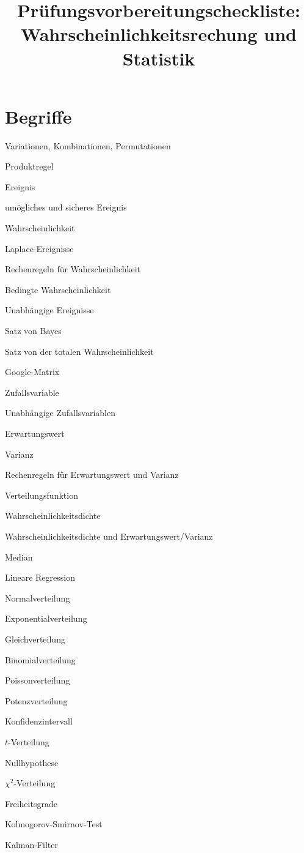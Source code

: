 \documentclass[a4paper,12pt,twocolumn]{article}
\begin{document}
\title{Prüfungsvorbereitungscheckliste:\\ Wahrscheinlichkeitsrechung und Statistik}
\date{}
\maketitle
\section{Begriffe}
\begin{compactenum}
\item Variationen, Kombinationen, Permutationen
\item Produktregel
\item Ereignis
\item umögliches und sicheres Ereignis
\item Wahrscheinlichkeit
\item Laplace-Ereignisse
\item Rechenregeln für Wahrscheinlichkeit
\item Bedingte Wahrscheinlichkeit
\item Unabhängige Ereignisse
\item Satz von Bayes
\item Satz von der totalen Wahrscheinlichkeit
\item Google-Matrix
\item Zufallsvariable
\item Unabhängige Zufallsvariablen
\item Erwartungswert
\item Varianz
\item Rechenregeln für Erwartungswert und Varianz
\item Verteilungsfunktion
\item Wahrscheinlichkeitsdichte
\item Wahrscheinlichkeitsdichte und Erwartungswert/Varianz
\item Median
\item Lineare Regression
\item Normalverteilung
\item Exponentialverteilung
\item Gleichverteilung
\item Binomialverteilung
\item Poissonverteilung
\item Potenzverteilung
\item Konfidenzintervall
\item $t$-Verteilung
\item Nullhypothese
\item $\chi^2$-Verteilung
\item Freiheitsgrade
\item Kolmogorov-Smirnov-Test
\item Kalman-Filter
\end{compactenum}
\vfill
\end{document}
